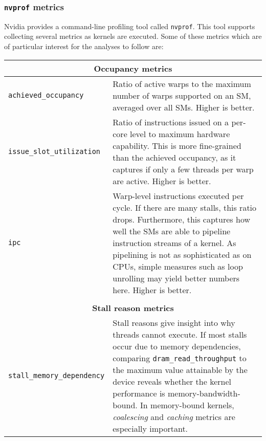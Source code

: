 \subsubsection{\texttt{nvprof} metrics} \label{sec:metrics}

Nvidia provides a command-line profiling tool called \texttt{nvprof}. This tool supports collecting several metrics as kernels are executed. Some of these metrics which are of particular interest for the analyses to follow are:

\begin{longtable}{p{} p{}}
    \multicolumn{2}{c}{\textbf{Occupancy metrics}} \\
    \hline
    \hline
    
    \raggedright \texttt{achieved\_\allowbreak occupancy} & Ratio of active warps to the maximum number of warps supported on an SM, averaged over all SMs. Higher is better. \\
    \hline
    \raggedright \texttt{issue\_\allowbreak slot\_\allowbreak utilization} & Ratio of instructions issued on a per-core level to maximum hardware capability. This is more fine-grained than the achieved occupancy, as it captures if only a few threads per warp are active. Higher is better. \\
    \hline
    \raggedright \texttt{ipc} & Warp-level instructions executed per cycle. If there are many stalls, this ratio drops. Furthermore, this captures how well the SMs are able to pipeline instruction streams of a kernel. As pipelining is not as sophisticated as on CPUs, simple measures such as loop unrolling may yield better numbers here. Higher is better. \\
    
    \\
    \multicolumn{2}{c}{\textbf{Stall reason metrics}} \\
    \hline
    \hline
    \raggedright \texttt{stall\_\allowbreak memory\_\allowbreak dependency} & Stall reasons give insight into why threads cannot execute. If most stalls occur due to memory dependencies, comparing \texttt{dram\_read\_throughput} to the maximum value attainable by the device reveals whether the kernel performance is memory-bandwidth-bound. In memory-bound kernels, \textit{coalescing} and \textit{caching} metrics are especially important. \\
    

\end{longtable}
